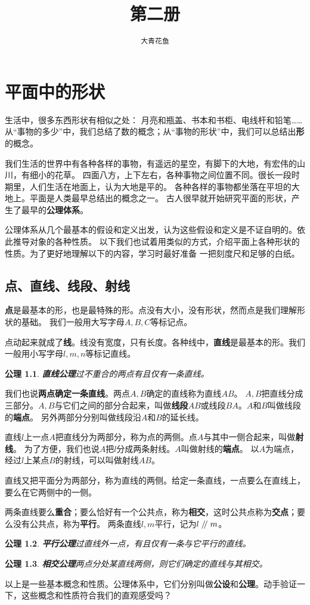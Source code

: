\documentclass[12pt,UTF8]{ctexbook}
\title{\zihao{0} \bfseries 第二册}
\author{\zihao{2} \texttt{大青花鱼}}
\date{}
\newtheorem{po}{公理}
\renewcommand\parallel{\mathrel{/\mskip-4mu/}}
\begin{document}
\maketitle
\tableofcontents
\newpage

\chapter{平面中的形状}

生活中，很多东西形状有相似之处：
月亮和瓶盖、书本和书柜、电线杆和铅笔……
从“事物的多少”中，我们总结了数的概念；从“事物的形状”中，我们可以总结出\textbf{形}的概念。

我们生活的世界中有各种各样的事物，有遥远的星空，有脚下的大地，有宏伟的山川，有细小的花草。
四面八方，上下左右，各种事物之间位置不同。很长一段时期里，人们生活在地面上，认为大地是平的。
各种各样的事物都坐落在平坦的大地上。平面是人类最早总结出的概念之一。
古人很早就开始研究平面的形状，产生了最早的\textbf{公理体系}。

公理体系从几个最基本的假设和定义出发，认为这些假设和定义是不证自明的。依此推导对象的各种性质。
以下我们也试着用类似的方式，介绍平面上各种形状的性质。为了更好地理解以下的内容，学习时最好准备
一把刻度尺和足够的白纸。

\section{点、直线、线段、射线}
\textbf{点}是最基本的形，也是最特殊的形。点没有大小，没有形状，然而点是我们理解形状的基础。
我们一般用大写字母$A,B,C$等标记点。

点动起来就成了\textbf{线}。线没有宽度，只有长度。各种线中，\textbf{直线}是最基本的形。我们一般用小写字母$l,m,n$等标记直线。
\begin{po}{\textbf{直线公理}}\label{po:0}
    过不重合的两点有且仅有一条直线。
\end{po}
我们也说\textbf{两点确定一条直线}。两点$A,B$确定的直线称为直线$AB$。
$A,B$把直线分成三部分。$A,B$与它们之间的部分合起来，叫做\textbf{线段}$AB$或线段$BA$。$A$和$B$叫做线段的\textbf{端点}。
另外两部分分别叫做线段沿$A$和$B$的延长线。

直线$l$上一点$A$把直线分为两部分，称为点的两侧。点$A$与其中一侧合起来，叫做\textbf{射线}。
为了方便，我们也说$A$把$l$分成两条射线。$A$叫做射线的\textbf{端点}。
以$A$为端点，经过$l$上某点$B$的射线，可以叫做射线$AB$。

直线又把平面分为两部分，称为直线的两侧。给定一条直线，一点要么在直线上，要么在它两侧中的一侧。

两条直线要么\textbf{重合}；要么恰好有一个公共点，称为\textbf{相交}，这时公共点称为\textbf{交点}；要么没有公共点，称为\textbf{平行}。
两条直线$l,m$平行，记为$l \parallel m$。
\begin{po}{\textbf{平行公理}}\label{po:1}
    过直线外一点，有且仅有一条与它平行的直线。
\end{po}
\begin{po}{\textbf{相交公理}}\label{po:2}
    两点分处某直线两侧，则它们确定的直线与其相交。
\end{po}
以上是一些基本概念和性质。公理体系中，它们分别叫做\textbf{公设}和\textbf{公理}。动手验证一下，这些概念和性质符合我们的直观感受吗？
\end{document}
